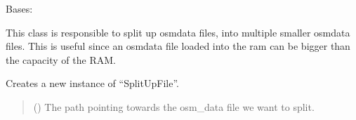 \documentclass[letterpaper,10pt,english]{sphinxmanual}
\begin{document}
\begin{fulllineitems}
\label{\detokenize{apidoc/src.osm_configurator.model.project.calculation:src.osm_configurator.model.project.calculation.split_up_files.SplitUpFile}}
\pysigstartsignatures
{}
\pysigstopsignatures
\sphinxAtStartPar
Bases: 

\sphinxAtStartPar
This class is responsible to split up osm\sphinxhyphen{}data files, into multiple smaller osm\sphinxhyphen{}data files.
This is useful since an osm\sphinxhyphen{}data file loaded into the ram can be bigger than the capacity of the RAM.

\begin{fulllineitems}
\label{\detokenize{apidoc/src.osm_configurator.model.project.calculation:src.osm_configurator.model.project.calculation.split_up_files.SplitUpFile.__init__}}
\pysigstartsignatures
{}
\pysigstopsignatures
\sphinxAtStartPar
Creates a new instance of “SplitUpFile”.
\begin{quote}\begin{description}
\sphinxAtStartPar
{} () \textendash{} The path pointing towards the osm\_data file we want to split.

\end{description}\end{quote}

\end{fulllineitems}



\end{fulllineitems}
\end{document}
